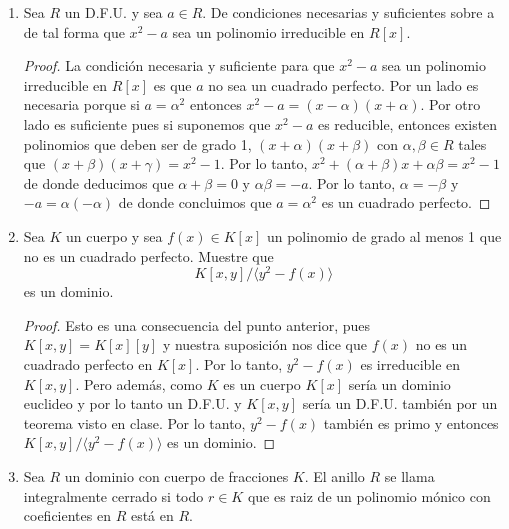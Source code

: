 \documentclass[letter,twoside,12pt]{article}
\begin{document}
\begin{enumerate}
\begin{enumerate}
\begin{proof}
Obsérvese que $p(x)=(x-\alpha_i)q(x)$ donde $ q(x) $ no es divisible por $ (x-\alpha_i) $.
Si $ p'(x) $ fuera divisible por $ (x-\alpha_i) $ entonces $ q(x) = p'(x)-(x-\alpha_i)q'(x) $ sería divisible por $ (x-\alpha_i) $ lo cual es una contradicción. Por lo tanto $ p'(x) $ no es divisible por $ x- \alpha_i $. Esto concluye la demostración.
\end{proof}
\end{enumerate}
\item Sea $R$ un D.F.U. y sea $ a \in R $. De condiciones necesarias y suficientes sobre a de tal forma que $x^2-a$ sea
un polinomio irreducible en $ R[x] $.
\begin{proof}
La condición necesaria y suficiente para que $ x^2-a $ sea un polinomio irreducible en $ R[x] $ es que $ a $ no sea un cuadrado perfecto. Por un lado es necesaria porque si $ a=\alpha^2 $ entonces $ x^2-a =(x-\alpha)(x+\alpha)$. Por otro lado es suficiente pues si suponemos que $ x^2-a $ es reducible, entonces existen polinomios que deben ser de grado 1, $ (x+\alpha)(x+\beta) $ con $ \alpha,\beta \in R $ tales que $ (x+\beta)(x+\gamma) = x^2-1 $. Por lo tanto, $ x^2+(\alpha+\beta)x+\alpha\beta =x^2-1$ de donde deducimos que $ \alpha+\beta = 0  $ y $ \alpha\beta = -a$. Por lo tanto, $ \alpha = - \beta $ y $-a = \alpha(-\alpha)$ de donde concluimos que $ a = \alpha^2 $ es un cuadrado perfecto.

\end{proof}
\item Sea $ K $ un cuerpo y sea $ f(x) \in K[x] $ un polinomio de grado al menos 1 que no es un cuadrado perfecto.
Muestre que
\begin{equation}
K[x,y]/\langle y^2-f(x)\rangle\nonumber
\end{equation}
es un dominio.

\begin{proof}
Esto es una consecuencia del punto anterior, pues $ K[x,y]=K[x][y] $ y nuestra suposición nos dice que $ f(x) $ no es un cuadrado perfecto en $ K[x] $. Por lo tanto, $ y^2 -f(x)$ es irreducible en $ K[x,y] $. Pero además, como $ K $ es un cuerpo $ K[x] $ sería un dominio euclideo y por lo tanto un D.F.U. y $ K[x,y] $ sería un D.F.U. también por un teorema visto en clase. Por lo tanto, $ y^2 -f(x)$ también es primo y entonces $ K[x,y]/\langle y^2-f(x)\rangle\nonumber $ es un dominio.
\end{proof}

\item Sea $ R $ un dominio con cuerpo de fracciones $ K $. El anillo $ R $ se llama integralmente cerrado si todo $ r \in K
$ que es raiz de un polinomio mónico con coeficientes en $ R $ está en $ R $.


\end{enumerate}
\end{document}

